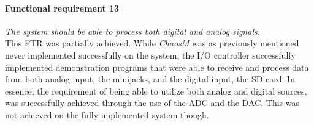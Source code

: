 \paragraph{Functional requirement 13}
\textit{The system should be able to process both digital and analog signals.}\\
This FTR was partially achieved. While \textit{ChaosM} was as previously mentioned never implemented successfully on the system, the I/O controller successfully implemented demonstration programs that were able to receive and process data from both analog input, the minijacks, and the digital input, the SD card.
In essence, the requirement of being able to utilize both analog and digital sources, was successfully achieved through the use of the ADC and the DAC. This was not achieved on the fully implemented system though.



\clearpage


\clearpage

